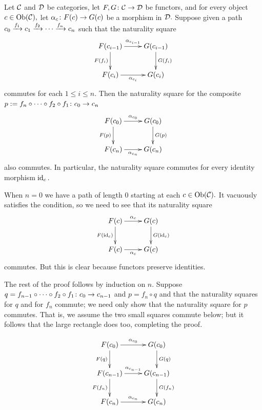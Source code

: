 \documentclass[../main/CT4S-EN-RU]{subfiles}
\begin{document}
\begin{exampleRUS}
\end{exampleRUS}

\begin{lemmaENG}\label{lemma:generators for nattrans}
Let $\mathcal{C}$ and $\mathcal{D}$ be categories, let $F,G\colon\mathcal{C}\rightarrow\mathcal{D}$ be functors, and for every object $c\in\operatorname{Ob}(\mathcal{C}),$ let $\alpha_c\colon F(c)\rightarrow G(c)$ be a morphism in $\mathcal{D}.$ Suppose given a path $c_0\xrightarrow{f_1}c_1\xrightarrow{f_2}\cdots\xrightarrow{f_n} c_n$ such that the naturality square 
$$
\xymatrix{F(c_{i-1})\ar[d]_{F(f_i)}\ar[r]^{\alpha_{c_{i-1}}}&G(c_{i-1})\ar[d]^{G(f_i)}\\F(c_i)\ar[r]_{\alpha_{c_i}}&G(c_i)
}
$$
commutes for each $1\leq i\leq n.$ Then the naturality square for the composite $p:=f_n\circ\cdots\circ f_2\circ f_1\colon c_0\rightarrow c_n$ 
$$\xymatrix{F(c_0)\ar[r]^{\alpha_{c_0}}\ar[d]_{F(p)}&G(c_0)\ar[d]^{G(p)}\\F(c_n)\ar[r]_{\alpha_{c_n}}&G(c_n)}
$$
also commutes. In particular, the naturality square commutes for every identity morphism $\operatorname{id}_c.$
\end{lemmaENG}

\begin{lemmaRUS}\label{lemma:generators for nattrans}
\end{lemmaRUS}

\begin{proofENG}
When $n=0$ we have a path of length 0 starting at each $c\in\operatorname{Ob}(\mathcal{C}).$ It vacuously satisfies the condition, so we need to see that its naturality square 
$$\xymatrix{F(c)\ar[r]^{\alpha_c}\ar[d]_{F(\id_c)}&G(c)\ar[d]^{G(\id_c)}\\F(c)\ar[r]_{\alpha_c}&G(c)}
$$
commutes. But this is clear because functors preserve identities. 

The rest of the proof follows by induction on $n.$ Suppose $q=f_{n-1}\circ\cdots\circ f_2\circ f_1\colon c_0\rightarrow c_{n-1}$ and $p=f_n\circ q$ and that the naturality squares for $q$ and for $f_n$ commute; we need only show that the naturality square for $p$ commutes. That is, we assume the two small squares commute below; but it follows that the large rectangle does too, completing the proof.

$$
\xymatrix{
F(c_0)\ar[r]^{\alpha_{c_0}}\ar[d]_{F(q)}&G(c_0)\ar[d]^{G(q)}\\
F(c_{n-1})\ar[r]^{\alpha_{c_{n-1}}}\ar[d]_{F(f_n)}&G(c_{n-1})\ar[d]^{G(f_n)}\\
F(c_n)\ar[r]^{\alpha_{c_n}}&G(c_n)
}
$$
\end{proofENG}
\end{document}
